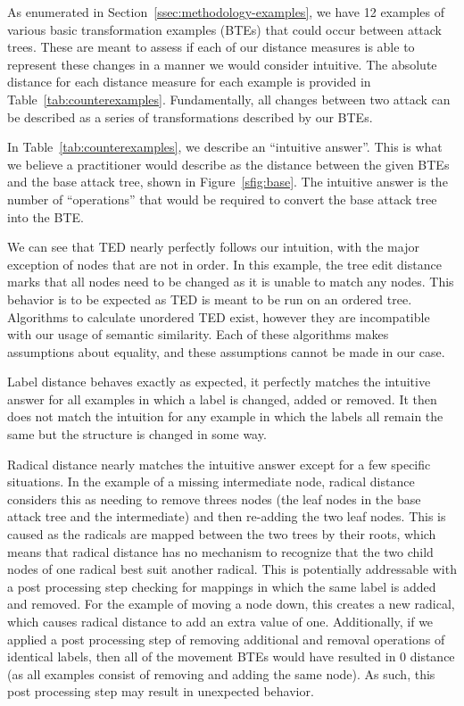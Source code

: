 As enumerated in Section~\ref{ssec:methodology-examples}, we have 12 examples of various basic transformation examples (BTEs) that could occur between attack trees. These are meant to assess if each of our distance measures is able to represent these changes in a manner we would consider intuitive. The absolute distance for each distance measure for each example is provided in Table~\ref{tab:counterexamples}. Fundamentally, all changes between two attack can be described as a series of transformations described by our BTEs.

In Table~\ref{tab:counterexamples}, we describe an ``intuitive answer''. This is what we believe a practitioner would describe as the distance between the given BTEs and the base attack tree, shown in Figure~\ref{sfig:base}. The intuitive answer is the number of ``operations'' that would be required to convert the base attack tree into the BTE.

We can see that TED nearly perfectly follows our intuition, with the major exception of nodes that are not in order. In this example, the tree edit distance marks that all nodes need to be changed as it is unable to match any nodes. This behavior is to be expected as TED is meant to be run on an ordered tree. Algorithms to calculate unordered TED exist, however they are incompatible with our usage of semantic similarity. Each of these algorithms makes assumptions about equality, and these assumptions cannot be made in our case.

Label distance behaves exactly as expected, it perfectly matches the intuitive answer for all examples in which a label is changed, added or removed. It then does not match the intuition for any example in which the labels all remain the same but the structure is changed in some way.

Radical distance nearly matches the intuitive answer except for a few specific situations. In the example of a missing intermediate node, radical distance considers this as needing to remove threes nodes (the leaf nodes in the base attack tree and the intermediate) and then re-adding the two leaf nodes. This is caused as the radicals are mapped between the two trees by their roots, which means that radical distance has no mechanism to recognize that the two child nodes of one radical best suit another radical. This is potentially addressable with a post processing step checking for mappings in which the same label is added and removed. For the example of moving a node down, this creates a new radical, which causes radical distance to add an extra value of one. Additionally, if we applied a post processing step of removing additional and removal operations of identical labels, then all of the movement BTEs would have resulted in 0 distance (as all examples consist of removing and adding the same node). As such, this post processing step may result in unexpected behavior.

